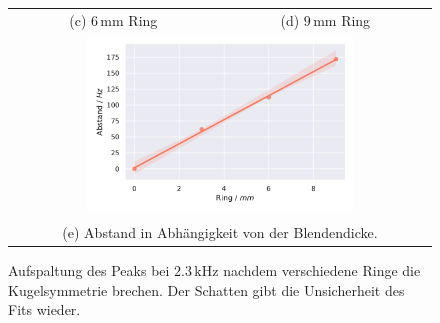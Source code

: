 \begin{figure}[H]
\begin{tabular}{cc}
  (c)  $6 \,\si{\milli\metre}$ Ring & (d)  $9 \,\si{\milli\metre}$ Ring \\[6pt]
  \multicolumn{2}{c}{\includegraphics[width=0.65\textwidth]{Daten/Wasserstoff/neu/spaltGesamt.pdf}}\\[6pt]
  \multicolumn{2}{c}{(e) Abstand in Abhängigkeit von der Blendendicke.}
  \end{tabular}
  \caption{Aufspaltung des Peaks bei $2.3 \,\si{\kilo\hertz}$ nachdem verschiedene Ringe die Kugelsymmetrie brechen. Der Schatten gibt die Unsicherheit des Fits wieder. } 
  \label{fig:hspalt}
\end{figure}

